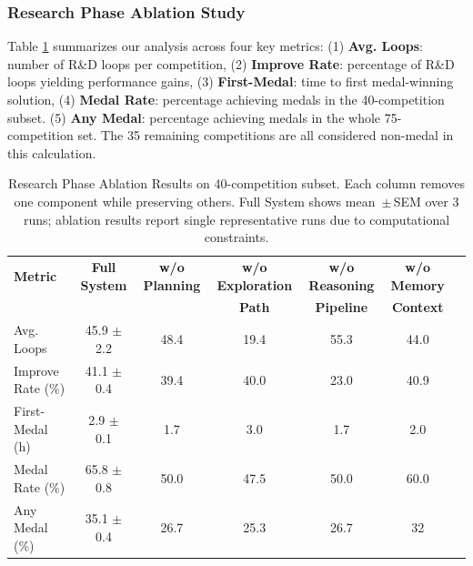 \subsubsection{Research Phase Ablation Study}

Table \ref{tab:research-ablation} summarizes our analysis across four key metrics:
(1) \textbf{Avg. Loops}: number of R\&D loops per competition,
(2) \textbf{Improve Rate}: percentage of R\&D loops yielding performance gains,
(3) \textbf{First-Medal}: time to first medal-winning solution,
(4) \textbf{Medal Rate}: percentage achieving medals in the 40-competition subset.
(5) \textbf{Any Medal}: percentage achieving medals in the whole 75-competition set. The 35 remaining competitions are all considered non-medal in this calculation.
\begin{table}[ht]
    \caption{Research Phase Ablation Results on 40-competition subset. Each column removes one component while preserving others. Full System shows mean \,$\pm$\,SEM over 3 runs; ablation results report single representative runs due to computational constraints.}
    \label{tab:research-ablation}
    \renewcommand{\arraystretch}{1.2}
    \begin{center}
        \begin{minipage}{\linewidth}
        \setlength{\tabcolsep}{2.5pt}
            \begin{tabular}{lcccccc}
                \hline
                \textbf{Metric} & \textbf{Full System} & \textbf{w/o Planning} & \textbf{w/o Exploration} & \textbf{w/o Reasoning} & \textbf{w/o Memory}\\
                & & & \textbf{Path} & \textbf{Pipeline} & \textbf{Context}\\
                \hline
                Avg. Loops & 45.9 $\pm$ 2.2 & 48.4 & 19.4 & 55.3 & 44.0\\
                Improve Rate (\%) & 41.1 $\pm$ 0.4 & 39.4 & 40.0 & 23.0 & 40.9\\
                First-Medal (h) & 2.9 $\pm$ 0.1 & 1.7 & 3.0 & 1.7 & 2.0\\
                Medal Rate (\%) & 65.8 $\pm$ 0.8 & 50.0 & 47.5 & 50.0 & 60.0\\
                Any Medal (\%) & 35.1 $\pm$ 0.4 & 26.7 & 25.3 & 26.7 & 32\\
                \hline
            \end{tabular}
        \end{minipage}
    \end{center}
\end{table}
 
